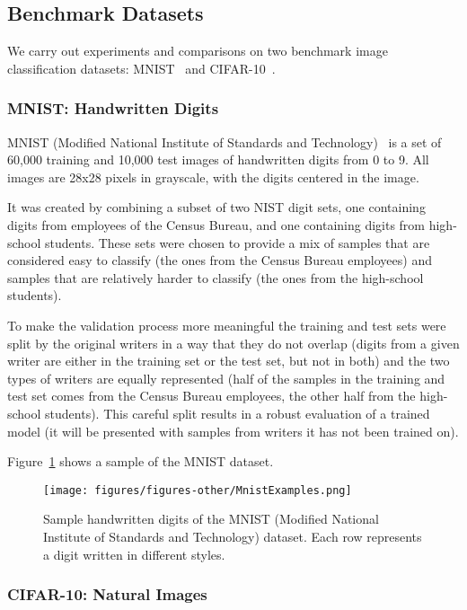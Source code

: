 \documentclass[../dropout-vs-batch-normalization.tex]{subfiles}
\begin{document}
\subsection{Benchmark Datasets}

We carry out experiments and comparisons on two benchmark image classification datasets: MNIST~\cite{LeCun1999} and CIFAR-10~\cite{Krizhevsky2009}.

\medskip
\subsubsection{MNIST: Handwritten Digits}

MNIST (Modified National Institute of Standards and Technology)~\cite{LeCun1999} is a set of 60,000 training and 10,000 test images of handwritten digits from 0 to 9. All images are 28x28 pixels in grayscale, with the digits centered in the image.

It was created by combining a subset of two NIST digit sets, one containing digits from employees of the Census Bureau, and one containing digits from high-school students. These sets were chosen to provide a mix of samples that are considered easy to classify (the ones from the Census Bureau employees) and samples that are relatively harder to classify (the ones from the high-school students).

To make the validation process more meaningful the training and test sets were split by the original writers in a way that they do not overlap (digits from a given writer are either in the training set or the test set, but not in both) and the two types of writers are equally represented (half of the samples in the training and test set comes from the Census Bureau employees, the other half from the high-school students). This careful split results in a robust evaluation of a trained model (it will be presented with samples from writers it has not been trained on).

Figure~\ref{fig:MnistExamples} shows a sample of the MNIST dataset.

\begin{figure}[!htbp]
\centerline{\texttt{[image: figures/figures-other/MnistExamples.png]}}
\caption{Sample handwritten digits of the MNIST (Modified National Institute of Standards and Technology) dataset. Each row represents a digit written in different styles.}
\label{fig:MnistExamples}
\end{figure}

\medskip
\subsubsection{CIFAR-10: Natural Images}
\end{document}

